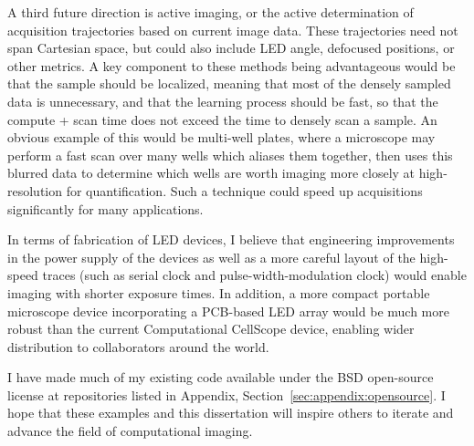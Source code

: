 A third future direction is active imaging, or the active determination of acquisition trajectories based on current image data. These trajectories need not span Cartesian space, but could also include LED angle, defocused positions, or other metrics. A key component to these methods being advantageous would be that the sample should be localized, meaning that most of the densely sampled data is unnecessary, and that the learning process should be fast, so that the compute + scan time does not exceed the time to densely scan a sample. An obvious example of this would be multi-well plates, where a microscope may perform a fast scan over many wells which aliases them together, then uses this blurred data to determine which wells are worth imaging more closely at high-resolution for quantification. Such a technique could speed up acquisitions significantly for many applications.

In terms of fabrication of LED devices, I believe that engineering improvements in the power supply of the devices as well as a more careful layout of the high-speed traces (such as serial clock and pulse-width-modulation clock) would enable imaging with shorter exposure times. In addition, a more compact portable microscope device incorporating a PCB-based LED array would be much more robust than the current Computational CellScope device, enabling wider distribution to collaborators around the world.

I have made much of my existing code available under the BSD open-source license at repositories listed in Appendix, Section~\ref{sec:appendix:opensource}. I hope that these examples and this dissertation will inspire others to iterate and advance the field of computational imaging.
